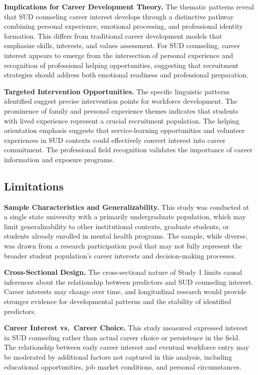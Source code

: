 \documentclass[
  man,
  longtable,
  nolmodern,
  notxfonts,
  notimes,
  colorlinks=true,linkcolor=blue,citecolor=blue,urlcolor=blue]{apa7}
\begin{document}
\textbf{Implications for Career Development Theory.} The thematic
patterns reveal that SUD counseling career interest develops through a
distinctive pathway combining personal experience, emotional processing,
and professional identity formation. This differs from traditional
career development models that emphasize skills, interests, and values
assessment. For SUD counseling, career interest appears to emerge from
the intersection of personal experience and recognition of professional
helping opportunities, suggesting that recruitment strategies should
address both emotional readiness and professional preparation.

\textbf{Targeted Intervention Opportunities.} The specific linguistic
patterns identified suggest precise intervention points for workforce
development. The prominence of family and personal experience themes
indicates that students with lived experience represent a crucial
recruitment population. The helping orientation emphasis suggests that
service-learning opportunities and volunteer experiences in SUD contexts
could effectively convert interest into career commitment. The
professional field recognition validates the importance of career
information and exposure programs.

\subsection{Limitations}\label{limitations}

\textbf{Sample Characteristics and Generalizability.} This study was
conducted at a single state university with a primarily undergraduate
population, which may limit generalizability to other institutional
contexts, graduate students, or students already enrolled in mental
health programs. The sample, while diverse, was drawn from a research
participation pool that may not fully represent the broader student
population's career interests and decision-making processes.

\textbf{Cross-Sectional Design.} The cross-sectional nature of Study 1
limits causal inferences about the relationship between predictors and
SUD counseling interest. Career interests may change over time, and
longitudinal research would provide stronger evidence for developmental
patterns and the stability of identified predictors.

\textbf{Career Interest vs.~Career Choice.} This study measured
expressed interest in SUD counseling rather than actual career choice or
persistence in the field. The relationship between early career interest
and eventual workforce entry may be moderated by additional factors not
captured in this analysis, including educational opportunities, job
market conditions, and personal circumstances.
\end{document}
